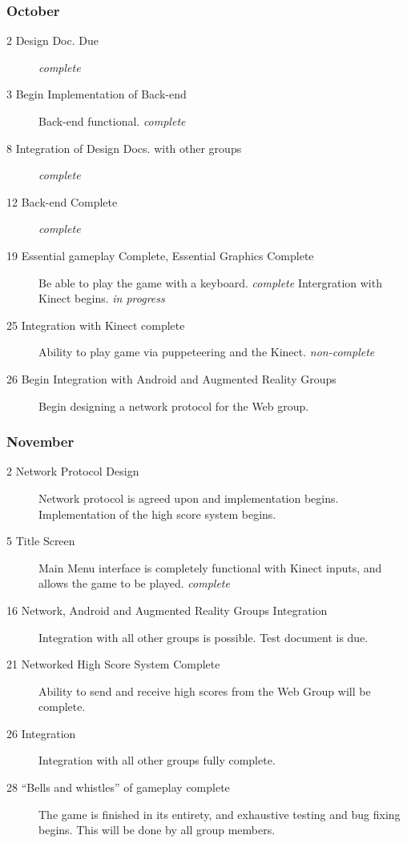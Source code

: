 \documentclass[10pt,letterpaper,oneside,english]{article}
\newcommand{\ncomp}{\emph{non-complete}}
\newcommand{\prog}{\emph{in progress}}
\begin{document}
\subsubsection{October}
\begin{description}
	\item [2 Design Doc. Due] \textit{complete}
	\item [3 Begin Implementation of Back-end] Back-end functional. \textit{complete}
	\item [8 Integration of Design Docs. with other groups] \textit{complete}
	\item [12 Back-end Complete] \textit{complete}
	\item [19 Essential gameplay Complete, Essential Graphics Complete] Be able to play the game with a keyboard. \textit{complete} Intergration with Kinect begins. \prog
	\item [25 Integration with Kinect complete] Ability to play game via puppeteering and the Kinect. \ncomp
	\item [26 Begin Integration with Android and Augmented Reality Groups] Begin designing a network protocol for the Web group.
\end{description}

\subsubsection{November}
\begin{description}
	\item [2 Network Protocol Design] Network protocol is agreed upon and implementation begins. Implementation of the high score system begins.
	\item [5 Title Screen] Main Menu interface is completely functional with Kinect inputs, and allows the game to be played. \textit{complete}
	\item [16 Network, Android and Augmented Reality Groups Integration] Integration with all other groups is possible. Test document is due.
	\item [21 Networked High Score System Complete] Ability to send and receive high scores from the Web Group will be complete.
	\item [26 Integration] Integration with all other groups fully complete.
	\item [28 ``Bells and whistles'' of gameplay complete] The game is finished in its entirety, and exhaustive testing and bug fixing begins. This will be done by all group members.
\end{description}
\end{document}
